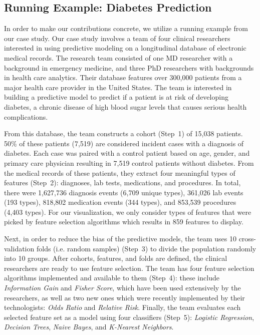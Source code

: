 \subsection{Running Example: Diabetes Prediction}
\label{sec:running_example}
In order to make our contributions concrete, we
utilize a running example from our case study.
Our case study involves a team of four clinical researchers interested
in using predictive modeling on a longitudinal database of
electronic medical records. The research team consisted of one MD researcher with a background in emergency medicine, and three PhD researchers with backgrounds in health care analytics.
Their database features over 300,000 patients from a major
health care provider in the United States.
The team is interested in building a predictive model to predict if a patient
is at risk of developing diabetes, a chronic disease of high blood sugar levels
that causes serious health complications.

From this database, the team constructs
a cohort (Step~1) of 15,038 patients.
50\% of these patients (7,519) are considered
incident cases with a diagnosis of diabetes.
Each case was paired with a control patient based on
age, gender, and primary care physician resulting
in 7,519 control patients without diabetes.
From the medical records of these patients,
they extract four meaningful types of features (Step~2): diagnoses,
lab tests, medications, and procedures.
In total, there were 1,627,736 diagnosis events (6,709 unique types), 361,026 lab events (193 types), 818,802 medication events (344 types), and 853,539 procedures (4,403 types).
For our visualization, we only consider types of features that were picked
by feature selection algorithms which results in 859 features to display.

Next, in order to reduce the bias of the predictive models,
the team uses 10 cross-validation folds (i.e. random samples) (Step~3) to divide the
population randomly into 10 groups.
After cohorts, features, and folds are defined, the
clinical researchers are ready to use feature selection.
The team has four feature selection algorithms implemented
and available to them (Step~4): these include \textit{Information Gain}
and \textit{Fisher Score}, which have been used extensively by the researchers,
as well as two new ones which were recently implemented by
their technologists: \textit{Odds Ratio} and \textit{Relative Risk}.
Finally, the team evaluates each selected feature set as a model using
four classifiers (Step~5): \textit{Logistic Regression}, \textit{Decision Trees},
\textit{Naive Bayes}, and \textit{K-Nearest Neighbors}.

